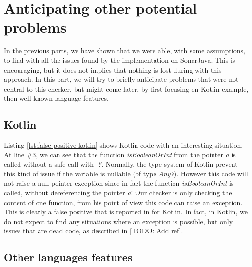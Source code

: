 \section{Anticipating other potential problems}
\label{sec:anticipating_problems}

In the previous parts, we have shown that we were able, with some assumptions, to find with \slang all the issues found by the implementation on SonarJava. 
This is encouraging, but it does not implies that nothing is lost during with this approach.
In this part, we will try to briefly anticipate problems that were not central to this checker, but might come later, by first focusing on Kotlin example, then well known language features.

\subsection{Kotlin}
\label{subsec:kotlin}



Listing \ref{lst:false-positive-kotlin} shows Kotlin code with an interesting situation. 
At line $\#3$, we can see that the function \emph{isBooleanOrInt} from the pointer \emph{a} is called without a safe call with \emph{.?}. 
Normally, the type system of Kotlin prevent this kind of issue if the variable is nullable (of type \emph{Any?}). 
However this code will not raise a null pointer exception since in fact the function \emph{isBooleanOrInt} is called, without dereferencing the pointer \emph{a}! 
Our checker is only checking the content of one function, from his point of view this code can raise an exception. 
This is clearly a false positive that is reported in for Kotlin. 
In fact, in Kotlin, we do not expect to find any situations where an exception is possible, but only issues that are dead code, as described in [TODO: Add ref].

\subsection{Other languages features}
\label{subsec:other_language_features}

